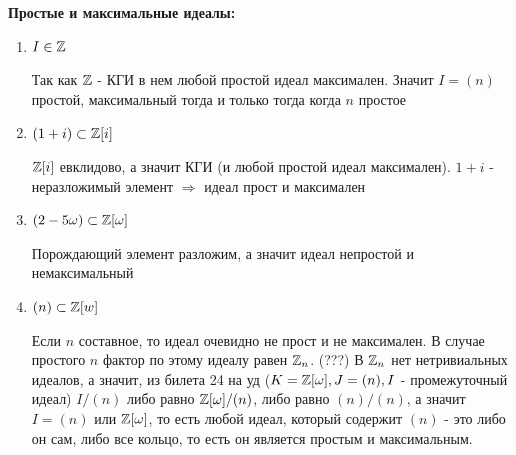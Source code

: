 \par \textbf{Простые и максимальные идеалы:}
\begin{enumerate}
    \item $I \in \mathbb{Z}$
    \par Так как $\mathbb{Z}$ - КГИ в нем любой простой идеал максимален. Значит $I=(n)$ простой, максимальный тогда и только тогда когда $n$ простое
    
    \item $(1+i)\subset \mathbb{Z}[i]$
    \par $\mathbb{Z}[i]$ евклидово, а значит КГИ (и любой простой идеал максимален). $1+i$ - неразложимый элемент $\Rightarrow$ идеал прост и максимален
    
    \item $(2-5\omega) \subset \mathbb{Z}[\omega]$
    \par Порождающий элемент разложим, а значит идеал непростой и немаксимальный
    
    \item $(n) \subset \mathbb{Z}[w]$
    \par Если $n$ составное, то идеал очевидно не прост и не максимален. В случае простого $n$ фактор по этому идеалу равен $\mathbb{Z}_n$. (???) В $\mathbb{Z}_n$ нет нетривиальных идеалов, а значит, из билета 24 на уд ($K=\mathbb{Z}[\omega], J=(n), I$ - промежуточный идеал) $I/(n)$ либо равно $\mathbb{Z}[\omega]/(n)$, либо равно $(n)/(n)$, а значит $I=(n)$ или $\mathbb{Z}[\omega]$, то есть любой идеал, который содержит $(n)$ - это либо он сам, либо все кольцо, то есть он является простым и максимальным.
\end{enumerate}